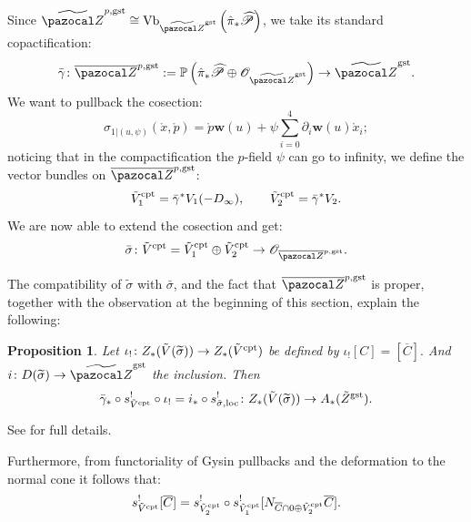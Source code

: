 \documentclass[11pt]{amsart}
\newcommand{\PP}{\mathbb P}
\newcommand{\OO}{\mathcal O}
\renewcommand{\to}{\rightarrow}
\newcommand{\Z}{\pazocal Z}
\newcommand{\tZ}{\widetilde{\pazocal Z}}
\newcommand{\oZp}{\overline{\Z}^{p,\rm{gst}}}
\newcommand{\w}{\mathbf{w}}
\theoremstyle{plain}
\newtheorem{prop}[thm]{Proposition}
\theoremstyle{definition}
\begin{document}
Since $\tZ^{p,\rm{gst}}\cong\operatorname{Vb}_{\tZ^{\rm{gst}}}\left(\hat{\pi}_*\widehat{\mathcal P}\right)$, we take its standard copactification:
\[\bar{\gamma}\colon \overline{\Z}^{p,\rm{gst}}:=\PP\left(\hat{\pi}_*\widehat{\mathcal P}\oplus \OO_{\tZ^{\rm{gst}}}\right)\to \tZ^{\rm{gst}}.\]
We want to pullback the cosection:
\[\sigma_{1|(u,\psi)}(\mathring{x},\mathring{p})=\mathring{p}\w(u)+\psi\sum_{i=0}^4\partial_i\w(u)\mathring{x}_i;\]
noticing that in the compactification the $p$-field $\psi$ can go to infinity, we define the vector bundles on $\oZp$:
\[\tilde{V}^{\rm{cpt}}_1=\bar{\gamma}^*V_1(-D_{\infty}),\qquad \tilde{V}^{\rm{cpt}}_2=\bar{\gamma}^*V_2.\]
We are now able to extend the cosection and get:
\[\bar{\sigma}\colon \tilde{V}^{\rm{cpt}}=\tilde{V}^{\rm{cpt}}_1\oplus \tilde{V}^{\rm{cpt}}_2\to\OO_{\oZp}. \]
 
 The compatibility of $\tilde\sigma$ with $\bar\sigma$, and the fact that $\oZp$ is proper, together with the observation at the beginning of this section, explain the following:
 \begin{prop}
 Let $\iota_{!}\colon Z_*(\tilde{V}(\widetilde{\sigma}))\to Z_*(\tilde{V}^{\rm{cpt}})$ be defined by 
 $\iota_{!}[C]=[\overline{C}].$ And $i\colon D(\widetilde{\sigma})\to \tZ^{\rm{gst}}$ the inclusion. Then
 \[\bar{\gamma}_*\circ s^{!}_{\tilde{V}^{\rm{cpt}}}\circ\iota_{!}=i_*\circ s^{!}_{\tilde\sigma,\rm{loc}}\colon  Z_*(\tilde{V}(\widetilde{\sigma}))\to A_*(\tilde{Z}^{\rm{gst}}).\]
 \end{prop}
 See \cite[Proposition~6.4]{CL} for full details.
 
 Furthermore, from functoriality of Gysin pullbacks and the deformation to the normal cone it follows that:
 \[s^!_{\tilde V^{\rm{cpt}}}[\overline C]=s^!_{\tilde V_2^{\rm{cpt}}}\circ s^!_{\tilde V_1^{\rm{cpt}}}[N_{\overline C\cap 0\oplus\tilde V_2^{\rm{cpt}}}\overline C].\]
 
\end{document}
